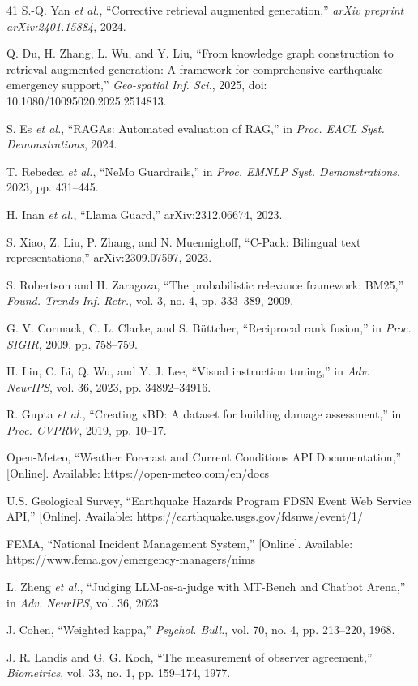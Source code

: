 \documentclass[conference]{IEEEtran}
\begin{document}
\begin{thebibliography}{41}
 S.-Q. Yan \textit{et al.}, ``Corrective retrieval augmented generation,'' \textit{arXiv preprint arXiv:2401.15884}, 2024.

 Q. Du, H. Zhang, L. Wu, and Y. Liu, ``From knowledge graph construction to retrieval-augmented generation: A framework for comprehensive earthquake emergency support,'' \textit{Geo-spatial Inf. Sci.}, 2025, doi: 10.1080/10095020.2025.2514813.

 S. Es \textit{et al.}, ``RAGAs: Automated evaluation of RAG,'' in \textit{Proc. EACL Syst. Demonstrations}, 2024.

 T. Rebedea \textit{et al.}, ``NeMo Guardrails,'' in \textit{Proc. EMNLP Syst. Demonstrations}, 2023, pp. 431--445.

 H. Inan \textit{et al.}, ``Llama Guard,'' arXiv:2312.06674, 2023.

 S. Xiao, Z. Liu, P. Zhang, and N. Muennighoff, ``C-Pack: Bilingual text representations,'' arXiv:2309.07597, 2023.

 S. Robertson and H. Zaragoza, ``The probabilistic relevance framework: BM25,'' \textit{Found. Trends Inf. Retr.}, vol. 3, no. 4, pp. 333--389, 2009.

 G. V. Cormack, C. L. Clarke, and S. B\"{u}ttcher, ``Reciprocal rank fusion,'' in \textit{Proc. SIGIR}, 2009, pp. 758--759.

 H. Liu, C. Li, Q. Wu, and Y. J. Lee, ``Visual instruction tuning,'' in \textit{Adv. NeurIPS}, vol. 36, 2023, pp. 34892--34916.

 R. Gupta \textit{et al.}, ``Creating xBD: A dataset for building damage assessment,'' in \textit{Proc. CVPRW}, 2019, pp. 10--17.

 Open-Meteo, ``Weather Forecast and Current Conditions API Documentation,'' [Online]. Available: https://open-meteo.com/en/docs

 U.S. Geological Survey, ``Earthquake Hazards Program FDSN Event Web Service API,'' [Online]. Available: https://earthquake.usgs.gov/fdsnws/event/1/

 FEMA, ``National Incident Management System,'' [Online]. Available: https://www.fema.gov/emergency-managers/nims

 L. Zheng \textit{et al.}, ``Judging LLM-as-a-judge with MT-Bench and Chatbot Arena,'' in \textit{Adv. NeurIPS}, vol. 36, 2023.

 J. Cohen, ``Weighted kappa,'' \textit{Psychol. Bull.}, vol. 70, no. 4, pp. 213--220, 1968.

 J. R. Landis and G. G. Koch, ``The measurement of observer agreement,'' \textit{Biometrics}, vol. 33, no. 1, pp. 159--174, 1977.
\end{thebibliography}
\end{document}
